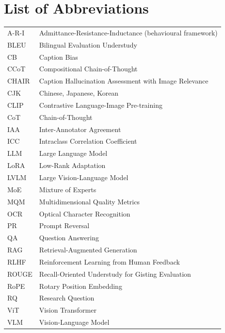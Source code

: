 \documentclass[MSc]{abdnthesis}
\begin{document}
\chapter*{List of Abbreviations}
\begin{tabular}{@{}ll@{}}
A-R-I   & Admittance-Resistance-Inductance (behavioural framework) \\
BLEU    & Bilingual Evaluation Understudy \\
CB      & Caption Bias \\
CCoT    & Compositional Chain-of-Thought \\
CHAIR   & Caption Hallucination Assessment with Image Relevance \\
CJK     & Chinese, Japanese, Korean \\
CLIP    & Contrastive Language-Image Pre-training \\
CoT     & Chain-of-Thought \\
IAA     & Inter-Annotator Agreement \\
ICC     & Intraclass Correlation Coefficient \\
LLM     & Large Language Model \\
LoRA    & Low-Rank Adaptation \\
LVLM    & Large Vision-Language Model \\
MoE     & Mixture of Experts \\
MQM     & Multidimensional Quality Metrics \\
OCR     & Optical Character Recognition \\
PR      & Prompt Reversal \\
QA      & Question Answering \\
RAG     & Retrieval-Augmented Generation \\
RLHF    & Reinforcement Learning from Human Feedback \\
ROUGE   & Recall-Oriented Understudy for Gisting Evaluation \\
RoPE    & Rotary Position Embedding \\
RQ      & Research Question \\
ViT     & Vision Transformer \\
VLM     & Vision-Language Model \\
\end{tabular}















\end{document}
